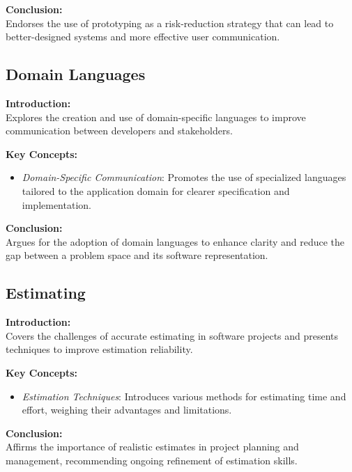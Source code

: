 \vspace{2mm}
\noindent\textbf{Conclusion:} \\
Endorses the use of prototyping as a risk-reduction strategy that can lead to better-designed systems and more effective user communication.

\subsection{Domain Languages}

\textbf{Introduction:} \\
Explores the creation and use of domain-specific languages to improve communication between developers and stakeholders.

\vspace{2mm}
\noindent\textbf{Key Concepts:}
\begin{itemize}
  \item \textit{Domain-Specific Communication}: Promotes the use of specialized languages tailored to the application domain for clearer specification and implementation.
\end{itemize}

\vspace{2mm}
\noindent\textbf{Conclusion:} \\
Argues for the adoption of domain languages to enhance clarity and reduce the gap between a problem space and its software representation.

\subsection{Estimating}

\textbf{Introduction:} \\
Covers the challenges of accurate estimating in software projects and presents techniques to improve estimation reliability.

\vspace{2mm}
\noindent\textbf{Key Concepts:}
\begin{itemize}
  \item \textit{Estimation Techniques}: Introduces various methods for estimating time and effort, weighing their advantages and limitations.
\end{itemize}

\vspace{2mm}
\noindent\textbf{Conclusion:} \\
Affirms the importance of realistic estimates in project planning and management, recommending ongoing refinement of estimation skills.
